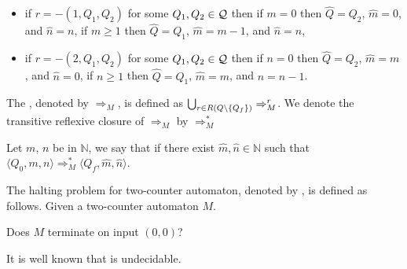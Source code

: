 \begin{definition}
\begin{itemize}
		\item if $r=-(1,Q_1,Q_2)$ for some $Q_1,Q_2\in \mathcal{Q}$ then
\subitem if $m=0$ then $\widehat{Q}=Q_2$, $\widehat{m}=0$, and $\widehat{n}=n$,
\subitem if $m\geq1$ then $\widehat{Q}=Q_1$, $\widehat{m}=m-1$, and $\widehat{n}=n$,
		\item if $r=-(2,Q_1,Q_2)$ for some $Q_1,Q_2\in \mathcal{Q}$ then
\subitem if $n=0$ then $\widehat{Q}=Q_2$, $\widehat{m}=m$, and $\widehat{n}=0$,
\subitem if $n\geq1$ then $\widehat{Q}=Q_1$, $\widehat{m}=m$, and $\widehat{n}=n-1$.
	\end{itemize}
	The , denoted by $\Rightarrow_M$, is defined as $\bigcup_{r\in R(Q\setminus\{Q_f\})}\Rightarrow^r_M$. We denote the transitive reflexive closure of $\Rightarrow_M$ by $\Rightarrow^*_M$
		
	Let $m$, $n$ be in $\mathbb{N}$, we say that  if there exist $\widehat{m},\widehat{n}\in\mathbb{N}$ such that $\langle Q_0,m,n\rangle\Rightarrow^*_M\langle Q_f,\widehat{m},\widehat{n}\rangle$.
\end{definition}
\begin{definition}
	The halting problem for two-counter automaton, denoted by \autHalt{}, is defined as follows.
	Given a two-counter automaton $M$. 
	\begin{center}
		Does $M$ terminate on input $(0,0)$?
	\end{center}
\end{definition}
It is well known that \autHalt{} is undecidable. %
